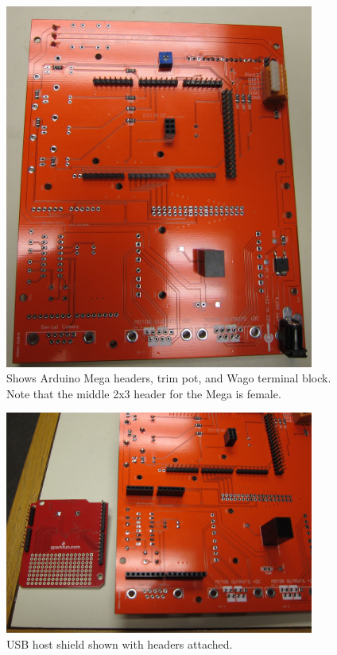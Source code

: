 \documentclass[11pt]{report} %
\begin{document}
\begin{figure}[!ht]
\centering
\includegraphics[width=4in]{IMG_3203.JPG}
\caption{Shows Arduino Mega headers, trim pot, and Wago terminal block. Note that the middle 2x3 header for the Mega is female.}
\label{megaHeader}
\end{figure}

\begin{figure}[!ht]
\centering
\includegraphics[width=4in]{IMG_3209.JPG}
\caption{USB host shield shown with headers attached. }
\label{usbHost}
\end{figure}

\clearpage
\end{document}
